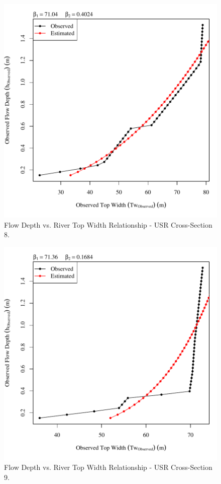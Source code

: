 \begin{center}
\begin{figure}[htbp]
	\includegraphics[width=6in]{"Figures/Results_USR/Survey Tw vs H-Section 8"}
	\caption{Flow Depth vs. River Top Width Relationship - USR Cross-Section 8.}
\end{figure}
\end{center}
\newpage

\begin{center}
\begin{figure}[htbp]
	\includegraphics[width=6in]{"Figures/Results_USR/Survey Tw vs H-Section 9"}
	\caption{Flow Depth vs. River Top Width Relationship - USR Cross-Section 9.}
\end{figure}
\end{center}
\newpage

